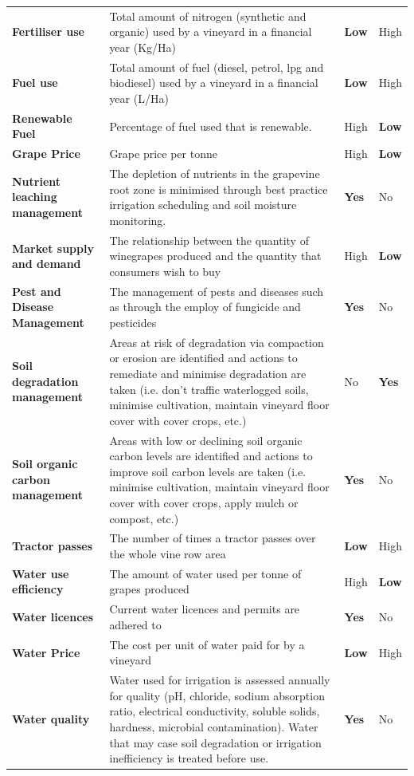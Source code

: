\begin{table}[h]
\begin{tabular}{@{}llll@{}}
    \textbf{Fertiliser use} & Total amount of nitrogen (synthetic and organic) used by a vineyard in a financial year (Kg/Ha) & \textbf{Low} & High \\
    \textbf{Fuel use} & Total amount of fuel (diesel, petrol, lpg and biodiesel) used by a vineyard in a financial year (L/Ha) & \textbf{Low} & High \\
    \textbf{Renewable Fuel} & Percentage of fuel used that is renewable. & High & \textbf{Low} \\
    \textbf{Grape Price} & Grape price per tonne & High & \textbf{Low} \\
    \textbf{Nutrient leaching management} & The depletion of nutrients in the grapevine root zone is minimised through best practice irrigation scheduling and soil moisture monitoring. & \textbf{Yes} & No \\
    \textbf{Market supply and demand} & The relationship between the quantity of winegrapes produced and the quantity that consumers wish to buy & High & \textbf{Low} \\
    \textbf{Pest and Disease Management} & The management of pests and diseases such as through the employ of fungicide and pesticides & \textbf{Yes} & No \\
    \textbf{Soil degradation management} & Areas at risk of degradation via compaction or erosion are identified and actions to remediate and minimise degradation are taken (i.e. don’t traffic waterlogged soils, minimise cultivation, maintain vineyard floor cover with cover crops, etc.) & No & \textbf{Yes} \\
    \textbf{Soil organic carbon management} & Areas with low or declining soil organic carbon levels are identified and actions to improve soil carbon levels are taken (i.e. minimise cultivation, maintain vineyard floor cover with cover crops, apply mulch or compost, etc.) & \textbf{Yes} & No \\
    \textbf{Tractor passes} & The number of times a tractor passes over the whole vine row area & \textbf{Low} & High \\
    \textbf{Water use efficiency} & The amount of water used per tonne of grapes produced & High & \textbf{Low} \\
    \textbf{Water licences} & Current water licences and permits are adhered to & \textbf{Yes} & No \\
    \textbf{Water Price} & The cost per unit of water paid for by a vineyard & \textbf{Low} & High \\
    \textbf{Water quality} & Water used for irrigation is assessed annually for quality (pH, chloride, sodium absorption ratio, electrical conductivity, soluble solids, hardness, microbial contamination). Water that may case soil degradation or irrigation inefficiency is treated before use. & \textbf{Yes} & No \\

\end{tabular}
\end{table}
